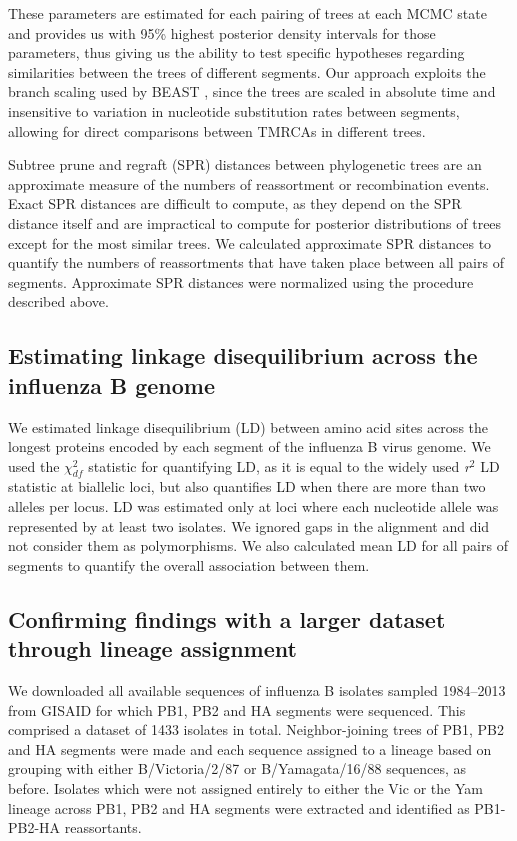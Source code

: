 \documentclass[11pt,oneside,letterpaper]{article}
\begin{document}
These parameters are estimated for each pairing of trees at each MCMC state and provides us with 95\% highest posterior density intervals for those parameters, thus giving us the ability to test specific hypotheses regarding similarities between the trees of different segments.
Our approach exploits the branch scaling used by BEAST \cite{drummond2012}, since the trees are scaled in absolute time and insensitive to variation in nucleotide substitution rates between segments, allowing for direct comparisons between TMRCAs in different trees.

Subtree prune and regraft (SPR) distances between phylogenetic trees are an approximate measure of the numbers of reassortment or recombination events.
Exact SPR distances are difficult to compute, as they depend on the SPR distance itself and are impractical to compute for posterior distributions of trees except for the most similar trees.
We calculated approximate SPR distances \cite{whidden2009,whidden2010,whidden2013} to quantify the numbers of reassortments that have taken place between all pairs of segments.
Approximate SPR distances were normalized using the procedure described above.

\subsection*{Estimating linkage disequilibrium across the influenza B genome}
We estimated linkage disequilibrium (LD) between amino acid sites across the longest proteins encoded by each segment of the influenza B virus genome.
We used the $\chi^{2}_{df}$ statistic \cite{zhao2005} for quantifying LD, as it is equal to the widely used \textit{r$^{2}$} LD statistic at biallelic loci, but also quantifies LD when there are more than two alleles per locus.
LD was estimated only at loci where each nucleotide allele was represented by at least two isolates.
We ignored gaps in the alignment and did not consider them as polymorphisms.
We also calculated mean LD for all pairs of segments to quantify the overall association between them.

\subsection*{Confirming findings with a larger dataset through lineage assignment}
We downloaded all available sequences of influenza B isolates sampled 1984--2013 from GISAID for which PB1, PB2 and HA segments were sequenced.
This comprised a dataset of 1433 isolates in total. 
Neighbor-joining trees \cite{saitou1987} of PB1, PB2 and HA segments were made and each sequence assigned to a lineage based on grouping with either B/Victoria/2/87 or B/Yamagata/16/88 sequences, as before.
Isolates which were not assigned entirely to either the Vic or the Yam lineage across PB1, PB2 and HA segments were extracted and identified as PB1-PB2-HA reassortants.
\end{document}
